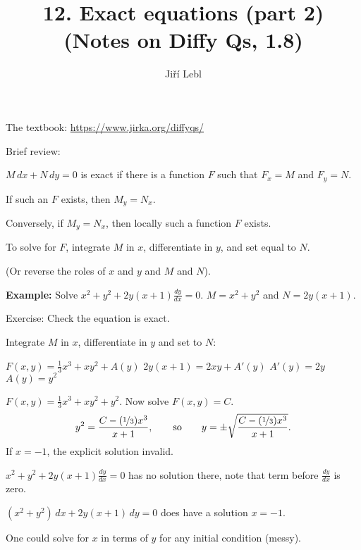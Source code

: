 \documentclass[10pt,aspectratio=169]{beamer}
\author{Ji\v{r}\'i Lebl}
\institute[OSU]{%
Oklahoma State University%
}
\title{12. Exact equations (part 2)\\(Notes on Diffy Qs, 1.8)}
\date{}
\begin{document}
\begin{frame}
\titlepage


\begin{center}
The textbook: \url{https://www.jirka.org/diffyqs/}
\end{center}
\end{frame}

\begin{frame}
Brief review:

\medskip
\pause

$M \, dx + N \, dy = 0$ is exact if there is a
function $F$ such that $F_x = M$ and $F_y = N$.

\medskip
\pause

If such an $F$ exists, then $M_y = N_x$.

\pause

Conversely, if $M_y = N_x$, then 
locally such a function $F$ exists.

\medskip
\pause

To solve for $F$, integrate $M$ in $x$, differentiate
in $y$, and set equal to $N$.

\pause
(Or reverse the roles of $x$ and $y$ and $M$ and $N$).

\end{frame}

\begin{frame}

\textbf{Example:}
Solve
\quad
$x^2+y^2 + 2y(x+1) \frac{dy}{dx} = 0$.
\qquad
\pause
$M=x^2+y^2$ \quad and \quad $N=2y(x+1)$.

\medskip
\pause

Exercise:
Check the equation is exact.

\medskip
\pause

Integrate $M$ in $x$, differentiate in $y$ and set to $N$:

\medskip
\pause

$F(x,y) = \frac{1}{3}x^3 + xy^2 + A(y)$
\pause
\wthus
$2y(x+1) = 2xy + A'(y)$
\pause
\wthus
$A'(y)=2y$
\pause
\wthus
$A(y) = y^2$

\medskip
\pause

\thus \quad
$F(x,y) = \frac{1}{3}x^3 + xy^2 + y^2$.
\quad
\pause
Now solve $F(x,y) = C$.
\pause
\begin{equation*}
y^2 = \frac{C-(\nicefrac{1}{3})x^3}{x+1},
\qquad \text{so} \qquad
y = \pm \sqrt{\frac{C-(\nicefrac{1}{3})x^3}{x+1}} .
\end{equation*}
If $x=-1$, the explicit solution invalid.

\medskip
\pause

$x^2+y^2 + 2y(x+1) \frac{dy}{dx} = 0$ has no solution there,
note that term before
$\frac{dy}{dx}$ is zero.

\medskip
\pause

$(x^2+y^2) \, dx + 2y(x+1) \, dy = 0$ does have a solution $x=-1$.

\medskip
\pause

One could solve for $x$ in terms of $y$ for any initial condition (messy).
\end{frame}
\end{document}
